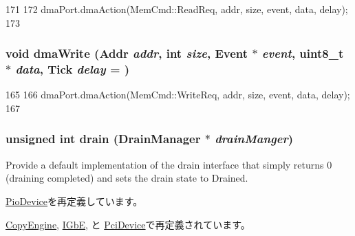 \begin{DoxyCode}
171     {
172         dmaPort.dmaAction(MemCmd::ReadReq, addr, size, event, data, delay);
173     }
\end{DoxyCode}
\hypertarget{classDmaDevice_a4a2db8a9eb52a00a9a2e19c2eb3753dc}{
\subsubsection[{dmaWrite}]{\setlength{\rightskip}{0pt plus 5cm}void dmaWrite ({\bf Addr} {\em addr}, \/  int {\em size}, \/  {\bf Event} $\ast$ {\em event}, \/  uint8\_\-t $\ast$ {\em data}, \/  {\bf Tick} {\em delay} = {})}}
\label{classDmaDevice_a4a2db8a9eb52a00a9a2e19c2eb3753dc}



\begin{DoxyCode}
165     {
166         dmaPort.dmaAction(MemCmd::WriteReq, addr, size, event, data, delay);
167     }
\end{DoxyCode}
\hypertarget{classDmaDevice_a6bf479c521c7c3eb473822d953275b26}{
\subsubsection[{drain}]{\setlength{\rightskip}{0pt plus 5cm}unsigned int drain ({\bf DrainManager} $\ast$ {\em drainManger})}}
\label{classDmaDevice_a6bf479c521c7c3eb473822d953275b26}
Provide a default implementation of the drain interface that simply returns 0 (draining completed) and sets the drain state to Drained. 

\hyperlink{classPioDevice_a6bf479c521c7c3eb473822d953275b26}{PioDevice}を再定義しています。

\hyperlink{classCopyEngine_a6bf479c521c7c3eb473822d953275b26}{CopyEngine}, \hyperlink{classIGbE_aa8a18d230dba7a674ac8a0b4f35bc36a}{IGbE}, と \hyperlink{classPciDevice_aa8a18d230dba7a674ac8a0b4f35bc36a}{PciDevice}で再定義されています。


